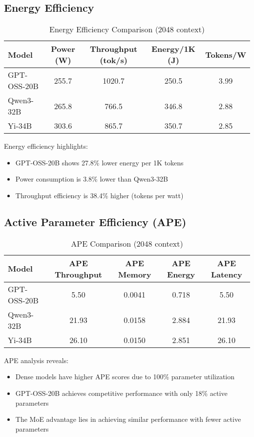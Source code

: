 \documentclass[11pt]{article}
\begin{document}
\subsection{Energy Efficiency}

\begin{table}[h]
\centering
\caption{Energy Efficiency Comparison (2048 context)}
\begin{tabular}{lcccc}
\toprule
Model & Power (W) & Throughput (tok/s) & Energy/1K (J) & Tokens/W \\
\midrule
GPT-OSS-20B & 255.7 & 1020.7 & 250.5 & 3.99 \\
Qwen3-32B & 265.8 & 766.5 & 346.8 & 2.88 \\
Yi-34B & 303.6 & 865.7 & 350.7 & 2.85 \\
\bottomrule
\end{tabular}
\end{table}

Energy efficiency highlights:
\begin{itemize}
    \item GPT-OSS-20B shows 27.8\% lower energy per 1K tokens
    \item Power consumption is 3.8\% lower than Qwen3-32B
    \item Throughput efficiency is 38.4\% higher (tokens per watt)
\end{itemize}

\subsection{Active Parameter Efficiency (APE)}

\begin{table}[h]
\centering
\caption{APE Comparison (2048 context)}
\begin{tabular}{lcccc}
\toprule
Model & APE Throughput & APE Memory & APE Energy & APE Latency \\
\midrule
GPT-OSS-20B & 5.50 & 0.0041 & 0.718 & 5.50 \\
Qwen3-32B & 21.93 & 0.0158 & 2.884 & 21.93 \\
Yi-34B & 26.10 & 0.0150 & 2.851 & 26.10 \\
\bottomrule
\end{tabular}
\end{table}

APE analysis reveals:
\begin{itemize}
    \item Dense models have higher APE scores due to 100\% parameter utilization
    \item GPT-OSS-20B achieves competitive performance with only 18\% active parameters
    \item The MoE advantage lies in achieving similar performance with fewer active parameters
\end{itemize}
\end{document}
